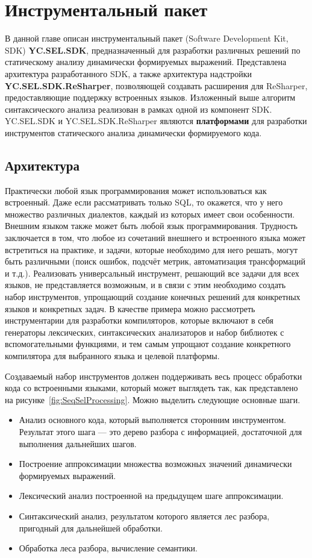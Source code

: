 \chapter{Инструментальный пакет} \label{relWorks}

В данной главе описан инструментальный пакет (Software Development Kit, SDK) \textbf{YC.SEL.SDK}, предназначенный для разработки различных решений по статическому анализу динамически формируемых выражений. Представлена архитектура разработанного SDK, а также архитектура надстройки \textbf{YC.SEL.SDK.ReSharper}, позволяющей создавать расширения для ReSharper, предоставляющие поддержку встроенных языков. Изложенный выше алгоритм синтаксического анализа реализован в рамках одной из компонент SDK. YC.SEL.SDK и YC.SEL.SDK.ReSharper являются \textbf{платформами} для разработки инструментов статического анализа динамически формируемого кода.

\section{Архитектура}

Практически любой язык программирования может использоваться как встроенный. Даже если рассматривать только SQL, то окажется, что у него множество различных диалектов, каждый из которых имеет свои особенности. Внешним языком также может быть любой язык программирования. Трудность заключается в том, что  любое из сочетаний внешнего и встроенного языка может встретиться на практике, и задачи, которые необходимо для него решать, могут быть различными (поиск ошибок, подсчёт метрик, автоматизация трансформаций и т.д.). Реализовать универсальный инструмент, решающий все задачи для всех языков, не представляется возможным, и в связи с этим необходимо создать набор инструментов, упрощающий создание конечных решений для конкретных языков и конкретных задач. В качестве примера можно рассмотреть инструментарии для разработки компиляторов, которые включают в себя генераторы лексических, синтаксических анализаторов и набор библиотек с вспомогательными функциями, и тем самым упрощают создание конкретного компилятора для выбранного языка и целевой платформы.

Создаваемый набор инструментов должен поддерживать весь процесс обработки кода со встроенными языками, который может выглядеть так, как представлено на рисунке~\ref{fig:SeqSelProcessing}. Можно выделить следующие основные шаги.
\begin{itemize}
    \item Анализ основного кода, который выполняется сторонним инструментом. Результат этого шага --- это дерево разбора с информацией, достаточной для выполнения дальнейших шагов.
    \item Построение аппроксимации множества возможных значений динамически формируемых выражений.
    \item Лексический анализ построенной на предыдущем шаге аппроксимации.
    \item Синтаксический анализ, результатом которого является лес разбора, пригодный для дальнейшей обработки.
    \item Обработка леса разбора, вычисление семантики.
\end{itemize}

